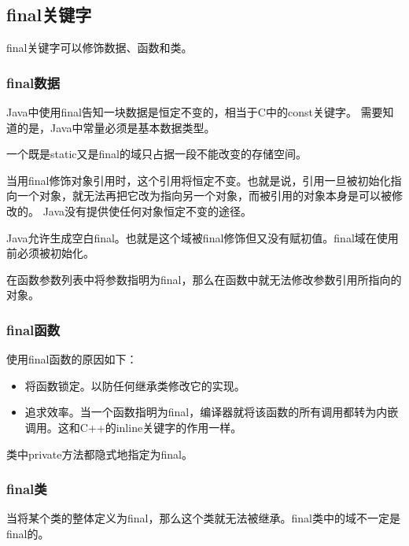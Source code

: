 \documentclass[a4paper,left=2.5cm,right=2.5cm,11pt]{article}
\begin{document}
\subsection{final关键字}
	final关键字可以修饰数据、函数和类。
\subsubsection{final数据}
	Java中使用final告知一块数据是恒定不变的，相当于C中的const关键字。
	需要知道的是，Java中常量必须是基本数据类型。\par
	一个既是static又是final的域只占据一段不能改变的存储空间。\par
	当用final修饰对象引用时，这个引用将恒定不变。也就是说，引用一旦被初始化指向一个对象，就无法再把它改为指向另一个对象，而被引用的对象本身是可以被修改的。
	Java没有提供使任何对象恒定不变的途径。\par
	Java允许生成空白final。也就是这个域被final修饰但又没有赋初值。final域在使用前必须被初始化。\par
	在函数参数列表中将参数指明为final，那么在函数中就无法修改参数引用所指向的对象。
\subsubsection{final函数}
	使用final函数的原因如下：
	\begin{itemize}
		\item 将函数锁定。以防任何继承类修改它的实现。
		\item 追求效率。当一个函数指明为final，编译器就将该函数的所有调用都转为内嵌调用。这和C++的inline关键字的作用一样。
	\end{itemize}

	类中private方法都隐式地指定为final。

\subsubsection{final类}
	当将某个类的整体定义为final，那么这个类就无法被继承。final类中的域不一定是final的。
\end{document}
